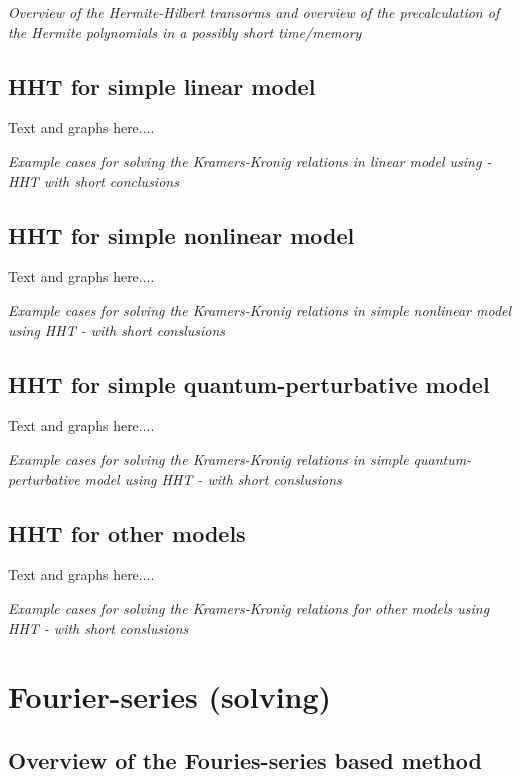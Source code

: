 \documentclass[12pt,twoside,a4paper]{article}
\numberwithin{equation}{subsection}
\numberwithin{figure}{subsection}
\begin{document}
\textit{Overview of the Hermite-Hilbert transorms and overview of the precalculation of the Hermite polynomials in a possibly short
time/memory}

\subsection{HHT for simple linear model} \label{chap:hermite_lin}

Text and graphs here.... 

\textit{Example cases for solving the Kramers-Kronig relations in linear model using  - HHT with short conclusions}

\subsection{HHT for simple nonlinear model} \label{chap:hermite_nlo}

Text and graphs here....

\textit{Example cases for solving the Kramers-Kronig relations in simple nonlinear model using HHT - with short conslusions}

\subsection{HHT for simple quantum-perturbative model} \label{chap:hermite_quantum}

Text and graphs here.... 

\textit{Example cases for solving the Kramers-Kronig relations in simple quantum-perturbative model using HHT - with short
conslusions}

\subsection{HHT for other models} \label{chap:hermite_other}

Text and graphs here.... 

\textit{Example cases for solving the Kramers-Kronig relations for other models using HHT - with short conslusions}

\section{Fourier-series (solving)} \label{chap:fourier}

\subsection{Overview of the Fouries-series based method}  \label{chap:fourier_overview}
\end{document}
